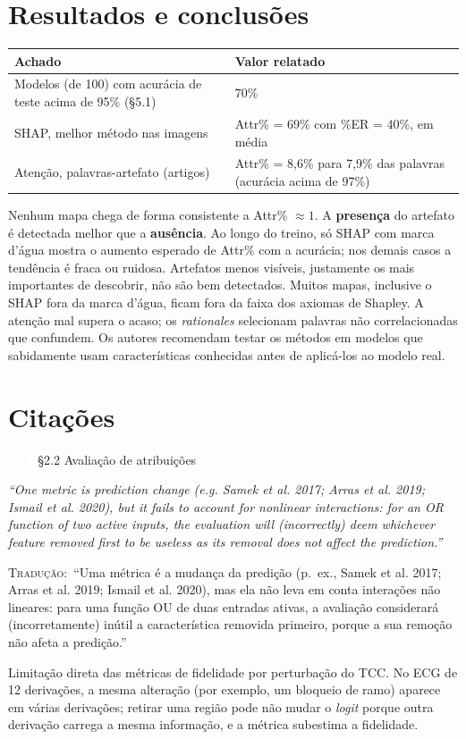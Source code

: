 \documentclass[11pt,a4paper]{article}
\newcommand{\pagechip}[1]{{\setlength{\fboxsep}{1.5pt}\colorbox{cAcc}{\textcolor{white}{\scriptsize\texttt{#1}}}}}
\newenvironment{origquote}{\par\itshape\small}{\par}
\newenvironment{tradquote}{\par\small\textsc{Tradução:}\ }{\par}
\newcommand{\explab}[1]{\par\smallskip{\small\color{cAcc}\textbf{\MakeUppercase{#1}}}\par}
\begin{document}
\section{Resultados e conclusões}
\begin{center}
\small
\begin{tabularx}{\linewidth}{lX}
\toprule
Achado & Valor relatado \\
\midrule
Modelos (de 100) com acurácia de teste acima de 95\% (§5.1) & 70\% \\
SHAP, melhor método nas imagens & Attr\% = 69\% com \%ER = 40\%, em média \\
Atenção, palavras-artefato (artigos) & Attr\% = 8,6\% para 7,9\% das palavras (acurácia acima de 97\%) \\
\bottomrule
\end{tabularx}
\end{center}
Nenhum mapa chega de forma consistente a Attr\% $\approx 1$. A \textbf{presença} do artefato é detectada melhor que a \textbf{ausência}. Ao longo do treino, só SHAP com marca d'água mostra o aumento esperado de Attr\% com a acurácia; nos demais casos a tendência é fraca ou ruidosa. Artefatos menos visíveis, justamente os mais importantes de descobrir, não são bem detectados. Muitos mapas, inclusive o SHAP fora da marca d'água, ficam fora da faixa dos axiomas de Shapley. A atenção mal supera o acaso; os \textit{rationales} selecionam palavras não correlacionadas que confundem. Os autores recomendam testar os métodos em modelos que sabidamente usam características conhecidas antes de aplicá-los ao modelo real.

\section{Citações}

\begin{citacard}{\pagechip{p. 2} §2.2 Avaliação de atribuições}
\begin{origquote}“One metric is prediction change (e.g. Samek et al. 2017; Arras et al. 2019; Ismail et al. 2020), but it fails to account for nonlinear interactions: for an OR function of two active inputs, the evaluation will (incorrectly) deem whichever feature removed first to be useless as its removal does not affect the prediction.”\end{origquote}
\begin{tradquote}“Uma métrica é a mudança da predição (p.~ex., Samek et al. 2017; Arras et al. 2019; Ismail et al. 2020), mas ela não leva em conta interações não lineares: para uma função OU de duas entradas ativas, a avaliação considerará (incorretamente) inútil a característica removida primeiro, porque a sua remoção não afeta a predição.”\end{tradquote}
\explab{Explicação}
Limitação direta das métricas de fidelidade por perturbação do TCC. No ECG de 12 derivações, a mesma alteração (por exemplo, um bloqueio de ramo) aparece em várias derivações; retirar uma região pode não mudar o \textit{logit} porque outra derivação carrega a mesma informação, e a métrica subestima a fidelidade.
\end{citacard}
\end{document}
